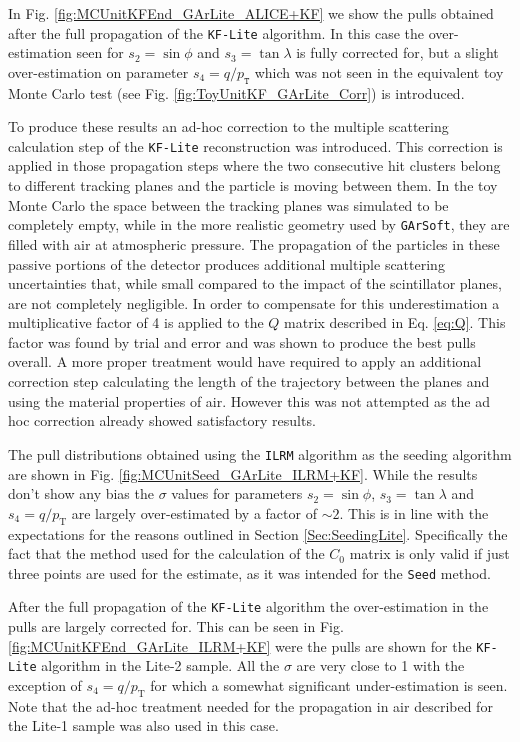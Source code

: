 In Fig. \ref{fig:MCUnitKFEnd_GArLite_ALICE+KF} we show the pulls obtained after the full propagation of the \texttt{KF-Lite} algorithm. In this case the over-estimation seen for $s_2=\sin\phi$ and $s_3=\tan\lambda$ is fully corrected for, but a slight over-estimation on parameter $s_4=q/p_\texttt{T}$ which was not seen in the equivalent toy Monte Carlo test (see Fig. \ref{fig:ToyUnitKF_GArLite_Corr}) is introduced. 

To produce these results an ad-hoc correction to the multiple scattering calculation step of the \texttt{KF-Lite} reconstruction was introduced. This correction is applied in those propagation steps where the two consecutive hit clusters belong to different tracking planes and the particle is moving between them. In the toy Monte Carlo the space between the tracking planes was simulated to be completely empty, while in the more realistic geometry used by \texttt{GArSoft}, they are filled with air at atmospheric pressure. The propagation of the particles in these passive portions of the detector produces additional multiple scattering uncertainties that, while small compared to the impact of the scintillator planes, are not completely negligible. In order to compensate for this underestimation a multiplicative factor of 4 is applied to the $Q$ matrix described in Eq. \ref{eq:Q}. This factor was found by trial and error and was shown to produce the best pulls overall. A more proper treatment would have required to apply an additional correction step calculating the length of the trajectory between the planes and using the material properties of air. However this was not attempted as the ad hoc correction already showed satisfactory results. 

The pull distributions obtained using the \texttt{ILRM} algorithm as the seeding algorithm  are shown in Fig. \ref{fig:MCUnitSeed_GArLite_ILRM+KF}. While the results don't show any bias the $\sigma$ values for parameters $s_2=\sin\phi$, $s_3=\tan\lambda$ and $s_4=q/p_\text{T}$ are largely over-estimated by a factor of $\sim2$. This is in line with the expectations for the reasons outlined in Section \ref{Sec:SeedingLite}. Specifically the fact that the method used for the calculation of the $C_0$ matrix is only valid if just three points are used for the estimate, as it was intended for the \texttt{Seed} method. 

After the full propagation of the \texttt{KF-Lite} algorithm the over-estimation in the pulls are largely corrected for. This can be seen in Fig. \ref{fig:MCUnitKFEnd_GArLite_ILRM+KF} were the pulls are shown for the \texttt{KF-Lite} algorithm in the Lite-2 sample. All the $\sigma$ are very close to 1 with the exception of $s_4=q/p_\text{T}$ for which a somewhat significant under-estimation is seen. Note that the ad-hoc treatment needed for the propagation in air described for the Lite-1 sample was also used in this case. 

